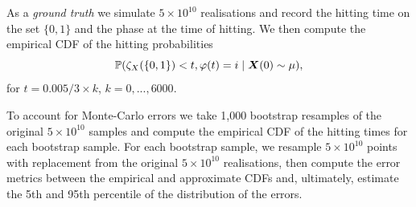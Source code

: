 As a \emph{ground truth} we simulate \(5\times 10^{10}\) realisations and record the hitting time on the set \(\{0,1\}\) and the phase at the time of hitting. We then compute the empirical CDF of the hitting probabilities 
\[\mathbb P(\zeta_{X}(\{0,1\}) < t, \varphi(t)=i\mid \boldsymbol X(0)\sim \mu),\] 
for \(t=0.005/3\times k\), \(k=0,...,6000\). 

To account for Monte-Carlo errors we take 1,000 bootstrap resamples of the original \(5\times 10^{10}\) samples and compute the empirical CDF of the hitting times for each bootstrap sample. For each bootstrap sample, we resample \(5\times 10^{10}\) points with replacement from the original \(5\times 10^{10}\) realisations, then compute the error metrics between the empirical and approximate CDFs and, ultimately, estimate the 5th and 95th percentile of the distribution of the errors. 

